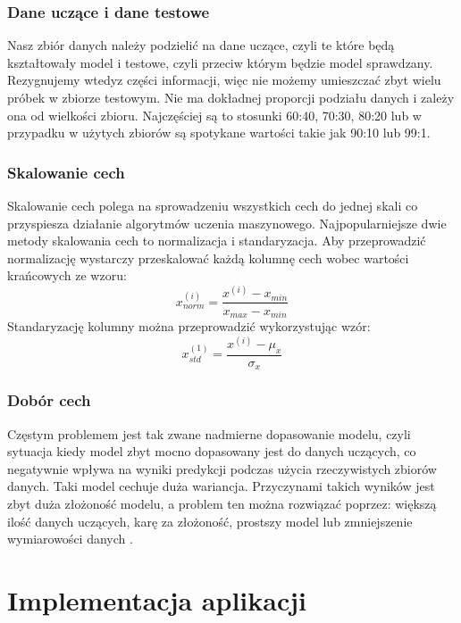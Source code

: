 \documentclass[printmode, eng, openany]{mgr}
\newcommand\tab[1][1cm]{\hspace*{#1}}
\begin{document}
\subsection{Dane uczące i dane testowe}
\tab Nasz zbiór danych należy podzielić na dane uczące, czyli te które będą kształtowały model i testowe, czyli przeciw którym będzie model sprawdzany. Rezygnujemy wtedy\linebreak z części informacji, więc nie możemy umieszczać zbyt wielu próbek w zbiorze testowym. Nie ma dokładnej proporcji podziału danych i zależy ona od wielkości zbioru. Najczęściej są to stosunki 60:40, 70:30, 80:20 lub w przypadku w użytych zbiorów są spotykane wartości takie jak 90:10 lub 99:1.
\subsection{Skalowanie cech}
\tab Skalowanie cech polega na sprowadzeniu wszystkich cech do jednej skali co przyspiesza działanie algorytmów uczenia maszynowego. Najpopularniejsze dwie metody skalowania cech to normalizacja i standaryzacja. Aby przeprowadzić normalizację wystarczy przeskalować każdą kolumnę cech wobec wartości krańcowych ze wzoru:\\
\begin{equation}
x^{(i)}_{norm} = \dfrac{x^{(i)}-x_{min}}{x_{max}-x_{min}}
\end{equation}
Standaryzację kolumny można przeprowadzić wykorzystując wzór:\\
\begin{equation}
x^{(1)}_{std} = \dfrac{x^{(i)} - \mu_x}{\sigma_x}
\end{equation}
\subsection{Dobór cech}
\tab Częstym problemem jest tak zwane nadmierne dopasowanie modelu, czyli sytuacja kiedy model zbyt mocno dopasowany jest do danych uczących, co negatywnie wpływa na wyniki predykcji podczas użycia rzeczywistych zbiorów danych. Taki model cechuje duża wariancja. Przyczynami takich wyników jest zbyt duża złożoność modelu, a problem ten można rozwiązać poprzez: większą ilość danych uczących, karę za złożoność, prostszy model lub zmniejszenie wymiarowości danych \cite{rash}. 
\chapter{Implementacja aplikacji}
\end{document}
